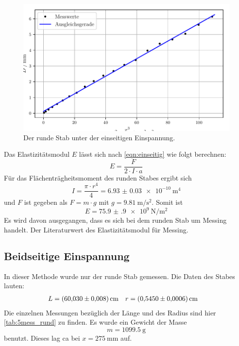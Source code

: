 \begin{figure}
  \centering
  \includegraphics{build/plotm1.pdf}
  \caption{Der runde Stab unter der einseitigen Einspannung.}
  \label{fig:plot1m}
\end{figure}
Das Elastizitätsmodul $E$ lässt sich nach \eqref{eqn:einseitig}
wie folgt berechnen:
\begin{equation*}
  E = \frac{F}{2 \cdot I \cdot a}
\end{equation*}
Für das Flächenträgheitsmoment des runden Stabes ergibt sich
\begin{equation}\label{eqn:Trägheitsmoment_rund}
  I = \frac{\pi \cdot r^4}{4} = \SI{6.93(3)e-10}{\metre\tothe{4}}
\end{equation} 
und $F$ ist gegeben als $F = m \cdot g$ mit $g = \SI{9.81}{\metre\per\second\squared}$.
Somit ist 
\begin{equation*}
  E = \SI{75.9(9)e9}{\newton\per\metre\squared}
\end{equation*}
Es wird davon ausgegangen, dass es sich bei dem runden Stab um Messing handelt.
Der Literaturwert des Elastizitätsmodul für Messing.

\subsection{Beidseitige Einspannung}
In dieser Methode wurde nur der runde Stab gemessen. Die Daten des Stabes lauten:
\begin{align*}
  L &= \SI{60.03\pm 0.008}{\centi\metre} & r &= \SI{0.545\pm 0.0006}{\centi\metre}
\end{align*}
Die einzelnen Messungen bezüglich der Länge und des Radius sind hier \ref{tab:5mess_rund} zu finden. 
Es wurde ein Gewicht der Masse 
\begin{equation*}
  m = \SI{1099.5}{\gram}
\end{equation*}
benutzt. Dieses lag ca bei $x = \SI{275}{\milli\metre}$ auf.

